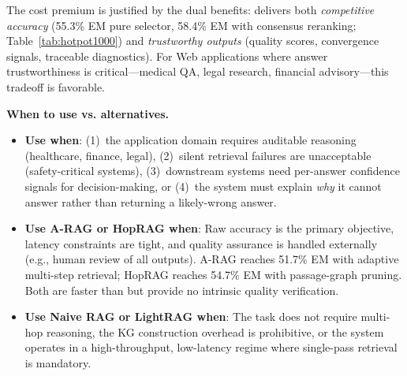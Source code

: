 The cost premium is justified by the dual benefits: \sys delivers both
\emph{competitive accuracy} (55.3\% EM pure selector, 58.4\% EM with consensus
reranking; Table~\ref{tab:hotpot1000}) and \emph{trustworthy outputs} (quality
scores, convergence signals, traceable diagnostics). For Web applications where
answer trustworthiness is critical---medical QA, legal research, financial
advisory---this tradeoff is favorable.

\smallskip
\noindent\textbf{When to use \sys vs. alternatives.}
\begin{itemize}
  \item \textbf{Use \sys when}: (1)~the application domain requires auditable
        reasoning (healthcare, finance, legal), (2)~silent retrieval failures
        are unacceptable (safety-critical systems), (3)~downstream systems need
        per-answer confidence signals for decision-making, or (4)~the system
        must explain \emph{why} it cannot answer rather than returning a
        likely-wrong answer.

  \item \textbf{Use A-RAG or HopRAG when}: Raw accuracy is the primary objective,
        latency constraints are tight, and quality assurance is handled externally
        (e.g., human review of all outputs). A-RAG reaches 51.7\% EM with adaptive
        multi-step retrieval; HopRAG reaches 54.7\% EM with passage-graph pruning.
        Both are faster than \sys but provide no intrinsic quality verification.

  \item \textbf{Use Naive RAG or LightRAG when}: The task does not require
        multi-hop reasoning, the KG construction overhead is prohibitive, or the
        system operates in a high-throughput, low-latency regime where single-pass
        retrieval is mandatory.
\end{itemize}

